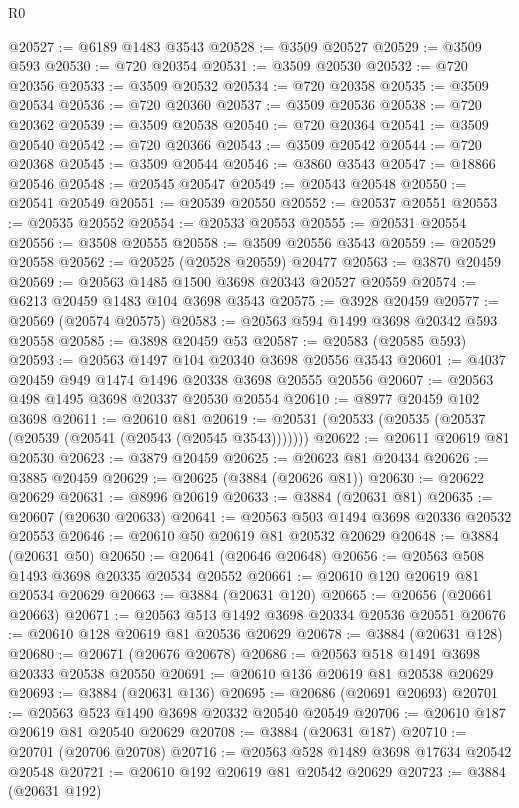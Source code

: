 \begin{lexlean}{R0}
\begin{coremodule}
@20527 := @6189 @1483 @3543
@20528 := @3509 @20527
@20529 := @3509 @593
@20530 := @720 @20354
@20531 := @3509 @20530
@20532 := @720 @20356
@20533 := @3509 @20532
@20534 := @720 @20358
@20535 := @3509 @20534
@20536 := @720 @20360
@20537 := @3509 @20536
@20538 := @720 @20362
@20539 := @3509 @20538
@20540 := @720 @20364
@20541 := @3509 @20540
@20542 := @720 @20366
@20543 := @3509 @20542
@20544 := @720 @20368
@20545 := @3509 @20544
@20546 := @3860 @3543
@20547 := @18866 @20546
@20548 := @20545 @20547
@20549 := @20543 @20548
@20550 := @20541 @20549
@20551 := @20539 @20550
@20552 := @20537 @20551
@20553 := @20535 @20552
@20554 := @20533 @20553
@20555 := @20531 @20554
@20556 := @3508 @20555
@20558 := @3509 @20556 @3543
@20559 := @20529 @20558
@20562 := @20525 (@20528 @20559) @20477
@20563 := @3870 @20459
@20569 := @20563 @1485 @1500 @3698 @20343 @20527 @20559
@20574 := @6213 @20459 @1483 @104 @3698 @3543
@20575 := @3928 @20459
@20577 := @20569 (@20574 @20575)
@20583 := @20563 @594 @1499 @3698 @20342 @593 @20558
@20585 := @3898 @20459 @53
@20587 := @20583 (@20585 @593)
@20593 := @20563 @1497 @104 @20340 @3698 @20556 @3543
@20601 := @4037 @20459 @949 @1474 @1496 @20338 @3698 @20555 @20556
@20607 := @20563 @498 @1495 @3698 @20337 @20530 @20554
@20610 := @8977 @20459 @102 @3698
@20611 := @20610 @81
@20619 := @20531 (@20533 (@20535 (@20537 (@20539 (@20541 (@20543 (@20545 @3543)))))))
@20622 := @20611 @20619 @81 @20530
@20623 := @3879 @20459
@20625 := @20623 @81 @20434
@20626 := @3885 @20459
@20629 := @20625 (@3884 (@20626 @81))
@20630 := @20622 @20629
@20631 := @8996 @20619
@20633 := @3884 (@20631 @81)
@20635 := @20607 (@20630 @20633)
@20641 := @20563 @503 @1494 @3698 @20336 @20532 @20553
@20646 := @20610 @50 @20619 @81 @20532 @20629
@20648 := @3884 (@20631 @50)
@20650 := @20641 (@20646 @20648)
@20656 := @20563 @508 @1493 @3698 @20335 @20534 @20552
@20661 := @20610 @120 @20619 @81 @20534 @20629
@20663 := @3884 (@20631 @120)
@20665 := @20656 (@20661 @20663)
@20671 := @20563 @513 @1492 @3698 @20334 @20536 @20551
@20676 := @20610 @128 @20619 @81 @20536 @20629
@20678 := @3884 (@20631 @128)
@20680 := @20671 (@20676 @20678)
@20686 := @20563 @518 @1491 @3698 @20333 @20538 @20550
@20691 := @20610 @136 @20619 @81 @20538 @20629
@20693 := @3884 (@20631 @136)
@20695 := @20686 (@20691 @20693)
@20701 := @20563 @523 @1490 @3698 @20332 @20540 @20549
@20706 := @20610 @187 @20619 @81 @20540 @20629
@20708 := @3884 (@20631 @187)
@20710 := @20701 (@20706 @20708)
@20716 := @20563 @528 @1489 @3698 @17634 @20542 @20548
@20721 := @20610 @192 @20619 @81 @20542 @20629
@20723 := @3884 (@20631 @192)

\end{coremodule}
\end{lexlean}
